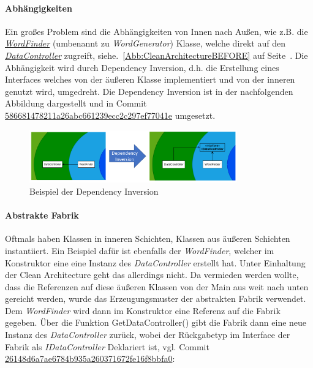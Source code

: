\paragraph{Abhängigkeiten}
Ein großes Problem sind die Abhängigkeiten von Innen nach Außen, wie z.B. die \href{https://github.com/EinToni/Wortfinder/blob/main/Wortfinder/WordGenerator.cs}{\textit{WordFinder}} (umbenannt zu \textit{WordGenerator}) Klasse, welche direkt auf den \href{https://github.com/EinToni/Wortfinder/blob/586681478211a26abc661239ecc2c297ef77041e/Wortfinder/DataController.cs}{\textit{DataController}} zugreift, siehe.~\ref{Abb:CleanArchitectureBEFORE} auf Seite~\pageref{Abb:CleanArchitectureBEFORE}. Die Abhängigkeit wird durch Dependency Inversion, d.h. die Erstellung eines Interfaces welches von der äußeren Klasse implementiert und von der inneren genutzt wird, umgedreht. Die Dependency Inversion ist in der nachfolgenden Abbildung dargestellt und in Commit \href{https://github.com/EinToni/Wortfinder/commit/586681478211a26abc661239ecc2c297ef77041e}{586681478211a26abc661239ecc2c297ef77041e} umgesetzt.
\newpage
\begin{figure}[!ht]
  \centering
  \includegraphics[width=0.8\textwidth]{Bilder/DependencyInversion.PNG}
  \caption{Beispiel der Dependency Inversion}
  \label{Abb:DependencyInversion}
\end{figure}

\paragraph{Abstrakte Fabrik}
Oftmals haben Klassen in inneren Schichten, Klassen aus äußeren Schichten instantiiert. Ein Beispiel dafür ist ebenfalls der  \textit{WordFinder}, welcher im Konstruktor eine eine Instanz des \textit{DataController} erstellt hat. Unter Einhaltung der Clean Architecture geht das allerdings nicht. Da vermieden werden wollte, dass die Referenzen auf diese äußeren Klassen von der Main aus weit \glqq nach unten gereicht\grqq{} werden, wurde das Erzeugungsmuster der abstrakten Fabrik verwendet. Dem \textit{WordFinder} wird dann im Konstruktor eine Referenz auf die Fabrik gegeben. Über die Funktion \glqq GetDataController()\grqq{} gibt die Fabrik dann eine neue Instanz des \textit{DataController} zurück, wobei der Rückgabetyp im Interface der Fabrik als \textit{IDataController} Deklariert ist, vgl. Commit \href{https://github.com/EinToni/Wortfinder/commit/26148d6a7ae6784b935a260371672fe16f8bbfa0}{26148d6a7ae6784b935a260371672fe16f8bbfa0}:

